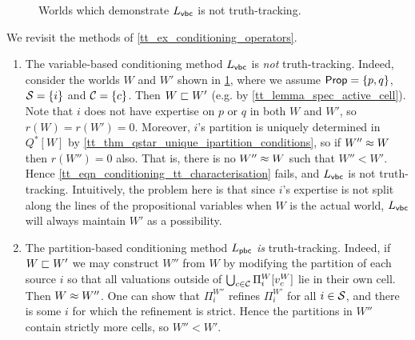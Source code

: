 \begin{figure}
    \centering
    
    \caption{Worlds which demonstrate $L_{\mathsf{vbc}}{}$ is not truth-tracking.}
    \label{tt_fig_vbc_counterexample}
\end{figure}

\begin{example}
    \label{tt_ex_conditioning_operators_revisited}
    We revisit the methods of \cref{tt_ex_conditioning_operators}.

    \begin{enumerate}

        \item The variable-based conditioning method $L_{\mathsf{vbc}}{}$ is \emph{not}
              truth-tracking. Indeed, consider the worlds $W$ and $W'$ shown in
              \cref{tt_fig_vbc_counterexample}, where we assume $\mathsf{Prop} = \{p,
              q\}$, $\mathcal{S} = \{i\}$ and $\mathcal{C} = \{c\}$. Then $W \sqsubset W'$
              (e.g. by \cref{tt_lemma_spec_active_cell}).
              Note that $i$ does not have expertise on $p$ or $q$ in both $W$
              and $W'$, so $r(W) = r(W') = 0$. Moreover, $i$'s partition is
              uniquely determined in $Q^*[W]$ by
              \cref{tt_thm_qstar_unique_ipartition_conditions}, so if $W'' \approx
              W$ then $r(W'') = 0$ also. That is, there is no $W'' \approx W$
              such that $W'' < W'$. Hence
              \cref{tt_eqn_conditioning_tt_characterisation} fails, and $L_{\mathsf{vbc}}{}$
              is not truth-tracking.
              Intuitively, the problem here is that since $i$'s expertise is
              not split along the lines of the propositional variables when $W$
              is the actual world, $L_{\mathsf{vbc}}{}$ will always maintain $W'$ as a
              possibility.

          \item The partition-based conditioning method $L_{\mathsf{pbc}}{}$ \emph{is}
                truth-tracking. Indeed, if $W \sqsubset W'$ we may construct
                $W''$ from $W$ by modifying the partition of each source $i$ so
                that all valuations outside of $\bigcup_{c \in
                \mathcal{C}}{\Pi^W_i[v^W_c]}$ lie in their own cell.
                Then $W \approx W''$. One can show that $\Pi^{W''}_i$ refines
                $\Pi^{W'}_i$ for all $i \in \mathcal{S}$, and there is some $i$ for
                which the refinement is strict. Hence the partitions in $W''$
                contain strictly more cells, so $W'' < W'$.

    \end{enumerate}

\end{example}

